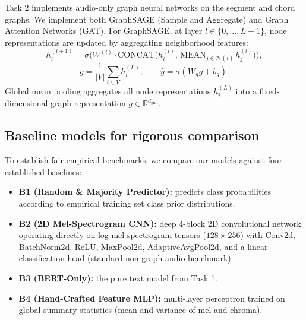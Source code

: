 \documentclass[10pt]{article}
\begin{document}
Task 2 implements audio-only graph neural networks on the segment and chord graphs. We implement both GraphSAGE (Sample and Aggregate) and Graph Attention Networks (GAT). For GraphSAGE, at layer $l \in \{0, \ldots, L{-}1\}$, node representations are updated by aggregating neighborhood features:
\begin{equation}
  h_i^{(l+1)} = \sigma\!\Big(W^{(l)} \cdot \text{CONCAT}\big(h_i^{(l)},\, \text{MEAN}_{j \in \mathcal{N}(i)}\, h_j^{(l)}\big)\Big),
\end{equation}
\begin{equation}
  g = \frac{1}{|V|}\sum_{i \in V} h_i^{(L)}, \qquad \hat{y} = \sigma(W_g g + b_g).
\end{equation}
Global mean pooling aggregates all node representations $h_i^{(L)}$ into a fixed-dimensional graph representation $g \in \mathbb{R}^{d_{\text{gnn}}}$.

\subsection{Baseline models for rigorous comparison}

To establish fair empirical benchmarks, we compare our models against four established baselines:
\begin{itemize}[nosep]
  \item \textbf{B1 (Random \& Majority Predictor):} predicts class probabilities according to empirical training set class prior distributions.
  \item \textbf{B2 (2D Mel-Spectrogram CNN):} deep 4-block 2D convolutional network operating directly on log-mel spectrogram tensors ($128 \times 256$) with Conv2d, BatchNorm2d, ReLU, MaxPool2d, AdaptiveAvgPool2d, and a linear classification head (standard non-graph audio benchmark).
  \item \textbf{B3 (BERT-Only):} the pure text model from Task 1.
  \item \textbf{B4 (Hand-Crafted Feature MLP):} multi-layer perceptron trained on global summary statistics (mean and variance of mel and chroma).
\end{itemize}
\end{document}
